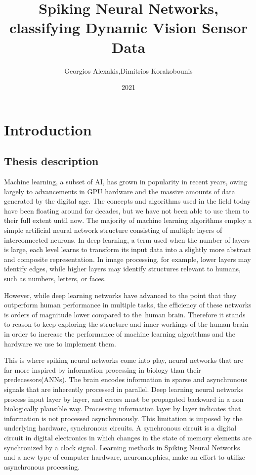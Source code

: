 \documentclass[12pt]{report}
\title{Spiking Neural Networks, classifying Dynamic Vision Sensor Data }
\author{Georgios Alexakis,Dimitrios Korakobounis}
\date{2021}
\begin{document}
\maketitle

\tableofcontents{}
\chapter{Introduction}
     
\section{Thesis description}

Machine learning, a subset of AI, has grown in popularity in recent years, owing largely to advancements in GPU hardware and the massive amounts of data generated by the digital age. The concepts and algorithms used in the field today have been floating around for decades, but we have not been able to use them to their full extent until now. The majority of machine learning algorithms employ a simple artificial neural network structure consisting of multiple layers of interconnected neurons. In deep learning, a term used when the number of layers is large, each level learns to transform its input data into a slightly more abstract and composite representation. In image processing, for example, lower layers may identify edges, while higher layers may identify structures relevant to humans, such as numbers, letters, or faces.

However, while deep learning networks have advanced to the point that they outperform human performance in multiple tasks, the efficiency of these networks is orders of magnitude lower compared to the human brain. Therefore it stands to reason to keep exploring the structure and inner workings of the human brain in order to increase the performance of machine learning algorithms and the hardware we use to implement them. 

This is where spiking neural networks come into play, neural networks that are far more inspired by information processing in biology than their predecessors(ANNs). The brain encodes information in sparse and asynchronous signals that are inherently processed in parallel. Deep learning neural networks process input layer by layer, and errors must be propagated backward in a non biologically plausible way. Processing information layer by layer indicates that information is not processed asynchronously. This limitation is imposed by the underlying hardware, synchronous circuits. A synchronous circuit is a digital circuit in digital electronics in which changes in the state of memory elements are synchronized by a clock signal. Learning methods in Spiking Neural Networks and a new type of computer hardware, neuromorphics, make an effort to utilize asynchronous processing.
\end{document}
